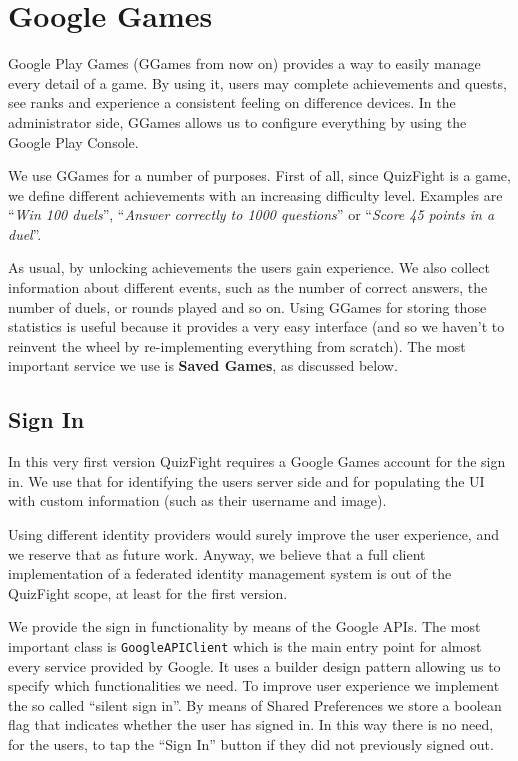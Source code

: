 \section{Google Games}\label{sec:ggames}

Google Play Games (GGames from now on) provides a way to easily manage every
detail of a game. By using it, users may complete achievements and quests,
see ranks and experience a consistent feeling on difference devices.
In the administrator side, GGames allows us to configure everything by using
the Google Play Console.

We use GGames for a number of purposes. First of all, since QuizFight is a
game, we define different achievements with an increasing difficulty level.
Examples are ``\textit{Win 100 duels}'', ``\textit{Answer correctly to 1000
questions}'' or ``\textit{Score 45 points in a duel}''.

As usual, by unlocking achievements the users gain experience.
We also collect information about different events, such as the number of
correct answers, the number of duels, or rounds played and so on.
Using GGames for storing those statistics is useful because it provides a
very easy interface (and so we haven't to reinvent the wheel by re-implementing
everything from scratch).
The most important service we use is \textbf{Saved Games}, as discussed below.

\subsection{Sign In}

In this very first version QuizFight requires a Google Games account for the
sign in. We use that for identifying the users server side and for populating
the UI with custom information (such as their username and image).

Using different identity providers would surely improve the user experience,
and we reserve that as future work.
Anyway, we believe that a full client implementation of a federated identity
management system is out of the QuizFight scope, at least for the first
version.

We provide the sign in functionality by means of the Google APIs.
The most important class is \texttt{GoogleAPIClient} which is the main entry
point for almost every service provided by Google.
It uses a builder design pattern allowing us to specify which functionalities
we need.
To improve user experience we implement the so called ``silent sign in''.
By means of Shared Preferences we store a boolean flag that indicates whether
the user has signed in.
In this way there is no need, for the users, to tap the ``Sign In'' button if
they did not previously signed out. 

